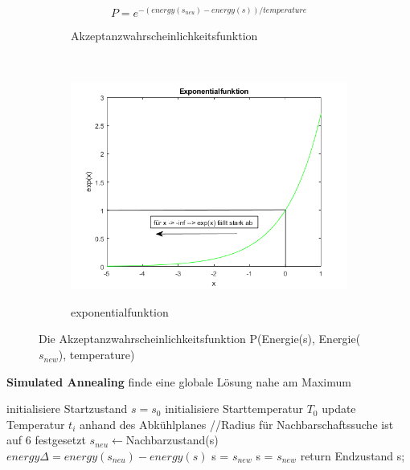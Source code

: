 \begin{figure}[H]
    \centering
    \begin{subfigure}[b]{0.4\textwidth}
        \begin{equation}\label{eq:unsere Energiefunktion}
            P = e^{-(energy(s_{neu}) - energy(s))/ temperature}
        \end{equation}
        \caption{Akzeptanzwahrscheinlichkeitsfunktion}
    \end{subfigure}
    ~ %
    \begin{subfigure}[b]{0.7\textwidth}
        \centering \includegraphics[interpolate=false,width=\linewidth]{content/simulatedAnnealing/Bilder/exponentialfunktion_as_PDF.png}
        \label{fig:Exponentialfunktion}
        \caption{exponentialfunktion}
    \end{subfigure}
    \caption{Die Akzeptanzwahrscheinlichkeitsfunktion P(Energie(s), Energie($s_{new}$), temperature)}
\end{figure}


\begin{algorithm}[H]
    \caption{\textbf{Simulated Annealing} finde eine globale Lösung nahe am Maximum}
    \begin{algorithmic}[1]
        \State initialisiere Startzustand $s=s_{0}$
        \State initialisiere Starttemperatur $T_0$
        \State update Temperatur $t_i$ anhand des Abkühlplanes
        \State //Radius für Nachbarschaftssuche ist auf 6 festgesetzt
        \State $s_{neu}\leftarrow$Nachbarzustand(s)
        \State $energy\Delta = energy(s_{neu}) - energy(s)$
        \State s = $s_{new}$
        \Else{}
        \State s = $s_{new}$
        \EndIf
        \EndIf
        \EndFor
        \State return Endzustand s;
    \end{algorithmic}
    \label{alg:retargeting}
\end{algorithm}


